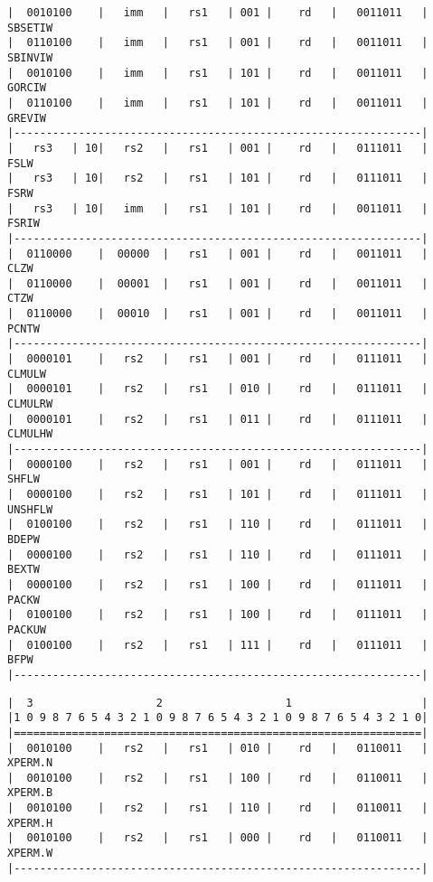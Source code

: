 \begin{minipage}{\linewidth}
\begin{verbatim}
|  0010100    |   imm   |   rs1   | 001 |    rd   |   0011011   |  SBSETIW
|  0110100    |   imm   |   rs1   | 001 |    rd   |   0011011   |  SBINVIW
|  0010100    |   imm   |   rs1   | 101 |    rd   |   0011011   |  GORCIW
|  0110100    |   imm   |   rs1   | 101 |    rd   |   0011011   |  GREVIW
|---------------------------------------------------------------|
|   rs3   | 10|   rs2   |   rs1   | 001 |    rd   |   0111011   |  FSLW
|   rs3   | 10|   rs2   |   rs1   | 101 |    rd   |   0111011   |  FSRW
|   rs3   | 10|   imm   |   rs1   | 101 |    rd   |   0011011   |  FSRIW
|---------------------------------------------------------------|
|  0110000    |  00000  |   rs1   | 001 |    rd   |   0011011   |  CLZW
|  0110000    |  00001  |   rs1   | 001 |    rd   |   0011011   |  CTZW
|  0110000    |  00010  |   rs1   | 001 |    rd   |   0011011   |  PCNTW
|---------------------------------------------------------------|
|  0000101    |   rs2   |   rs1   | 001 |    rd   |   0111011   |  CLMULW
|  0000101    |   rs2   |   rs1   | 010 |    rd   |   0111011   |  CLMULRW
|  0000101    |   rs2   |   rs1   | 011 |    rd   |   0111011   |  CLMULHW
|---------------------------------------------------------------|
|  0000100    |   rs2   |   rs1   | 001 |    rd   |   0111011   |  SHFLW
|  0000100    |   rs2   |   rs1   | 101 |    rd   |   0111011   |  UNSHFLW
|  0100100    |   rs2   |   rs1   | 110 |    rd   |   0111011   |  BDEPW
|  0000100    |   rs2   |   rs1   | 110 |    rd   |   0111011   |  BEXTW
|  0000100    |   rs2   |   rs1   | 100 |    rd   |   0111011   |  PACKW
|  0100100    |   rs2   |   rs1   | 100 |    rd   |   0111011   |  PACKUW
|  0100100    |   rs2   |   rs1   | 111 |    rd   |   0111011   |  BFPW
|---------------------------------------------------------------|
\end{verbatim}
\end{minipage}

\begin{minipage}{\linewidth}
\begin{verbatim}
|  3                   2                   1                    |
|1 0 9 8 7 6 5 4 3 2 1 0 9 8 7 6 5 4 3 2 1 0 9 8 7 6 5 4 3 2 1 0|
|===============================================================|
|  0010100    |   rs2   |   rs1   | 010 |    rd   |   0110011   |  XPERM.N
|  0010100    |   rs2   |   rs1   | 100 |    rd   |   0110011   |  XPERM.B
|  0010100    |   rs2   |   rs1   | 110 |    rd   |   0110011   |  XPERM.H
|  0010100    |   rs2   |   rs1   | 000 |    rd   |   0110011   |  XPERM.W
|---------------------------------------------------------------|
\end{verbatim}
\end{minipage}



